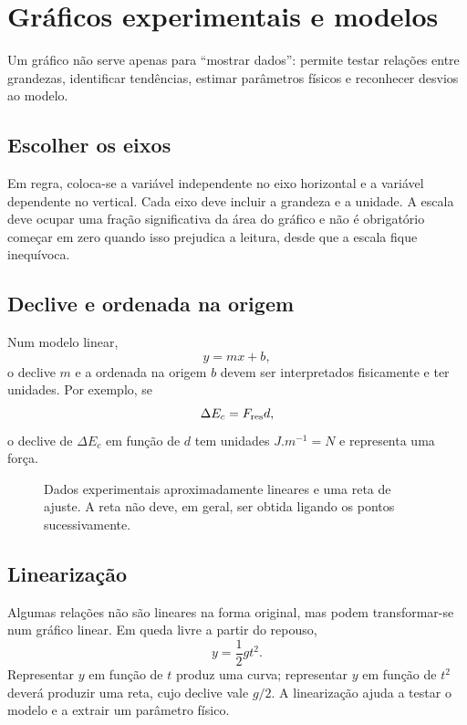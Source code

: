 \documentclass[11pt,a4paper,openany]{book}
\begin{document}
\section{Gráficos experimentais e modelos}
Um gráfico não serve apenas para ``mostrar dados'': permite testar relações entre grandezas, identificar tendências, estimar parâmetros físicos e reconhecer desvios ao modelo.

\subsection{Escolher os eixos}
Em regra, coloca-se a variável independente no eixo horizontal e a variável dependente no vertical. Cada eixo deve incluir a grandeza e a unidade. A escala deve ocupar uma fração significativa da área do gráfico e não é obrigatório começar em zero quando isso prejudica a leitura, desde que a escala fique inequívoca.

\subsection{Declive e ordenada na origem}
Num modelo linear,
\[
y=mx+b,
\]
o declive $m$ e a ordenada na origem $b$ devem ser interpretados fisicamente e ter unidades. Por exemplo, se
\[
\Delta E_c=F_{\rm res}d,
\]
o declive de $\Delta E_c$ em função de $d$ tem unidades $\si{J.m^{-1}}=\si{N}$ e representa uma força.

\begin{figure}[H]
\centering
{}
\caption{Dados experimentais aproximadamente lineares e uma reta de ajuste. A reta não deve, em geral, ser obtida ligando os pontos sucessivamente.}
\end{figure}

\subsection{Linearização}
Algumas relações não são lineares na forma original, mas podem transformar-se num gráfico linear. Em queda livre a partir do repouso,
\[
y=\frac12gt^2.
\]
Representar $y$ em função de $t$ produz uma curva; representar $y$ em função de $t^2$ deverá produzir uma reta, cujo declive vale $g/2$. A linearização ajuda a testar o modelo e a extrair um parâmetro físico.
\end{document}
